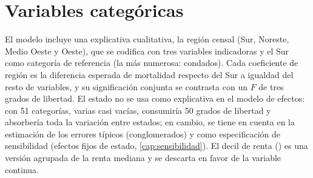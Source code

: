 

\section{Variables categóricas}\label{sec:categoricas}

El modelo incluye una explicativa cualitativa, la región censal (Sur, Noreste, Medio Oeste y
Oeste), que se codifica con tres variables indicadoras y el Sur como categoría de referencia
(la más numerosa:  condados). Cada coeficiente de región es la diferencia esperada
de mortalidad respecto del Sur a igualdad del resto de variables, y su significación conjunta se
contrasta con un $F$ de tres grados de libertad. El estado no se usa como explicativa en el
modelo de efectos: con 51 categorías, varias casi vacías, consumiría 50 grados de libertad y
absorbería toda la variación entre estados; en cambio, se tiene en cuenta en la estimación de
los errores típicos (conglomerados) y como especificación de sensibilidad (efectos fijos de
estado, \cref{cap:sensibilidad}). El decil de renta () es una versión agrupada de
la renta mediana y se descarta en favor de la variable continua.
